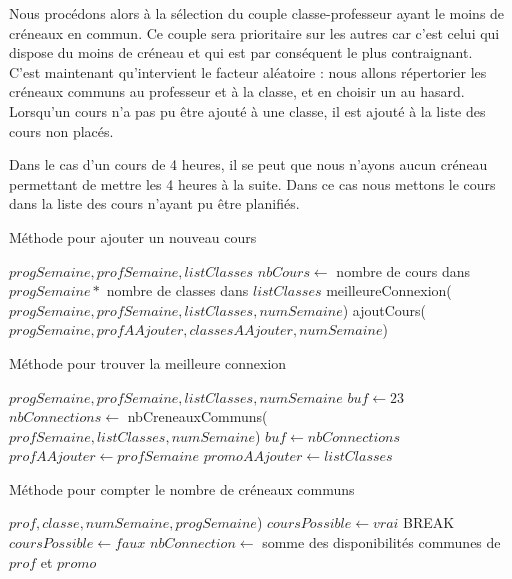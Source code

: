 Nous procédons alors à la sélection du couple classe-professeur ayant le moins de créneaux en commun. Ce couple sera prioritaire sur les autres car c'est celui qui dispose du moins de créneau et qui est par conséquent le plus contraignant.\\

C'est maintenant qu'intervient le facteur aléatoire : nous allons répertorier les créneaux communs au professeur et à la classe, et en choisir un au hasard.\\

Lorsqu'un cours n'a pas pu être ajouté à une classe, il est ajouté à la liste des cours non placés.

Dans le cas d'un cours de 4 heures, il se peut que nous n'ayons aucun créneau permettant de mettre les 4 heures à la suite. Dans ce cas nous mettons le cours dans la liste des cours n'ayant pu être planifiés. 

\begin{algorithm}
\caption {Méthode pour ajouter un nouveau cours}
\begin{algorithmic}
\REQUIRE $progSemaine, profSemaine, listClasses$
\STATE $nbCours \leftarrow $ nombre de cours dans $progSemaine * $ nombre de classes dans $listClasses$
\STATE meilleureConnexion($progSemaine, profSemaine, listClasses, numSemaine$)
\STATE ajoutCours($progSemaine, profAAjouter, classesAAjouter, numSemaine$)
\ELSE
{}
\ENDIF
\ENDFOR
{}
\end{algorithmic}
\end{algorithm}

\newpage

\begin{algorithm}
\caption {Méthode pour trouver la meilleure connexion}
\begin{algorithmic}
\REQUIRE $progSemaine, profSemaine, listClasses, numSemaine$
\STATE $buf \leftarrow 23$
\STATE $nbConnections \leftarrow $ nbCreneauxCommuns($profSemaine, listClasses, numSemaine$)
\STATE $buf \leftarrow nbConnections$
\STATE $profAAjouter \leftarrow profSemaine$
\STATE $promoAAjouter \leftarrow listClasses$
\ENDIF
\ENDFOR
\ENDFOR
\end{algorithmic}
\end{algorithm}

\begin{algorithm}
\caption {Méthode pour compter le nombre de créneaux communs}
\begin{algorithmic}
\REQUIRE $prof, classe, numSemaine, progSemaine$)
\STATE $coursPossible \leftarrow vrai$
\STATE BREAK
\ELSE
\STATE $coursPossible \leftarrow faux$
\ENDIF
\ENDFOR
{}
\RETURN $nbConnection \leftarrow $ somme des disponibilités communes de $prof$ et $promo$
\ENDIF
{}
\end{algorithmic}
\end{algorithm}


